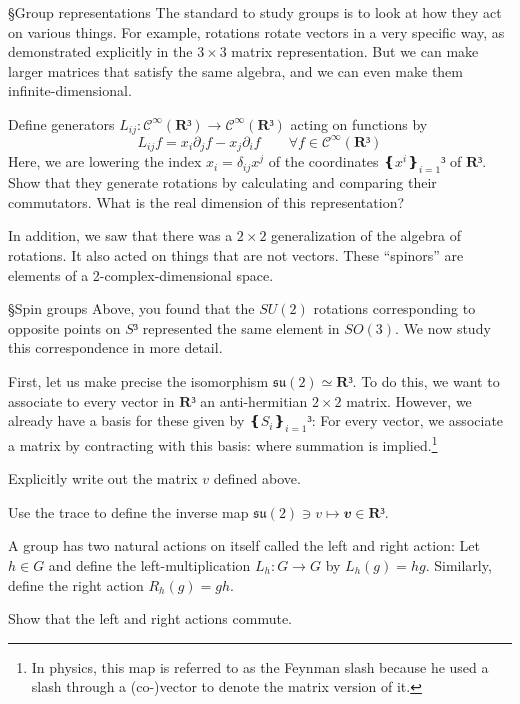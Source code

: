§{Group representations}
The standard to study groups is to look at how they act on various things. For example, rotations rotate vectors in a very specific way, as demonstrated explicitly in the $3×3$ matrix representation. 
But we can make larger matrices that satisfy the same algebra, and we can even make them infinite-dimensional.
\begin{exercise} 
Define generators $L_{ij}: 𝒞^∞(𝐑³)→ 𝒞^∞(𝐑³)$ acting on functions by 
$$
L_{ij}f = x_i ∂_jf - x_j ∂_if\quad \quad ∀ f ∈ 𝒞^∞(𝐑³)
$$
Here, we are lowering the index $x_i = δ_{ij} x^j$ of the coordinates $❴x^i❵_{i=1}³$ of $𝐑³$. Show that they generate rotations by calculating and comparing their commutators. What is the real dimension of this representation?
\end{exercise} 
In addition, we saw that there was a $2×2$ generalization of the algebra of rotations. It also acted on things that are not vectors. These “spinors” are elements of a 2-complex-dimensional space.

§{Spin groups}
Above, you found that the $SU(2)$ rotations corresponding to opposite points on $S³$ represented the same element in $SO(3)$. We now study this correspondence in more detail.

First, let us make precise the isomorphism $𝔰𝔲(2) ≃ 𝐑³$. To do this, we want to associate to every vector in $𝐑³$ an anti-hermitian $2×2$ matrix. However, we already have a basis for these given by $❴S_i❵_{i=1}³$: For every vector, we associate a matrix by contracting with this basis:
where summation is implied.\footnote{In physics, this map is referred to as the Feynman slash because he used a slash through a (co-)vector to denote the matrix version of it.}
\begin{exercise}
Explicitly write out the matrix $v$ defined above. 
\end{exercise}
\begin{exercise}
Use the trace to define the inverse map $𝔰𝔲(2) ∋ v ↦ 𝒗 ∈ 𝐑³$.
\end{exercise} 

A group has two natural actions on itself called the left and right action: Let $h∈ G$ and define the left-multiplication $L_h : G → G$ by $L_h(g) = hg$. Similarly, define the right action $R_h(g) = gh$. 
\begin{exercise}
Show that the left and right actions commute. 
\end{exercise} 

